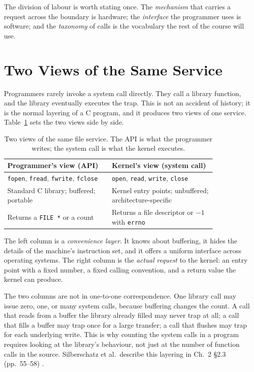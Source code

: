 \documentclass[11pt]{article}
\begin{document}
The division of labour is worth stating once. The \emph{mechanism} that carries
a request across the boundary is hardware; the \emph{interface} the programmer
uses is software; and the \emph{taxonomy} of calls is the vocabulary the rest of
the course will use.

\section{Two Views of the Same Service}

\noindent{}

Programmers rarely invoke a system call directly. They call a library function,
and the library eventually executes the trap. This is not an accident of
history; it is the normal layering of a C program, and it produces two views of
one service. Table~\ref{tab:two-views} sets the two views side by side.

\begin{table}[h]
\centering
\small
\renewcommand{\arraystretch}{1.3}
\begin{tabular}{@{}>{\raggedright\arraybackslash}p{0.42\linewidth}>{\raggedright\arraybackslash}p{0.42\linewidth}@{}}
\toprule
\textbf{Programmer's view (API)} & \textbf{Kernel's view (system call)} \\
\midrule
\texttt{fopen}, \texttt{fread}, \texttt{fwrite}, \texttt{fclose} &
\texttt{open}, \texttt{read}, \texttt{write}, \texttt{close} \\
Standard C library; buffered; portable &
Kernel entry points; unbuffered; architecture-specific \\
Returns a \texttt{FILE *} or a count &
Returns a file descriptor or $-1$ with \texttt{errno} \\
\bottomrule
\end{tabular}
\caption{Two views of the same file service. The API is what the programmer
writes; the system call is what the kernel executes.}
\label{tab:two-views}
\end{table}

The left column is a \emph{convenience layer}. It knows about buffering, it
hides the details of the machine's instruction set, and it offers a uniform
interface across operating systems. The right column is the \emph{actual
request} to the kernel: an entry point with a fixed number, a fixed calling
convention, and a return value the kernel can produce.

The two columns are not in one-to-one correspondence. One library call may
issue zero, one, or many system calls, because buffering changes the count.
A call that reads from a buffer the library already filled may never trap at
all; a call that fills a buffer may trap once for a large transfer; a call that
flushes may trap for each underlying write. This is why counting the system
calls in a program requires looking at the library's behaviour, not just at the
number of function calls in the source. Silberschatz et al.\ describe this
layering in Ch.~2 \S2.3 (pp.~55--58) \cite{SilberschatzOSC_operating_system_concepts}.
\end{document}
